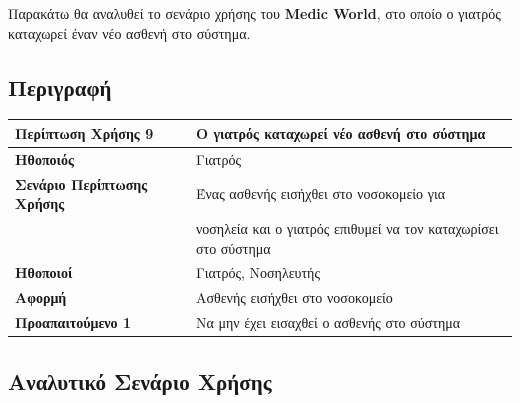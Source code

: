 \documentclass{article}
\newcommand\T{\rule{0pt}{2.6ex}}       %
\newcommand\B{\rule[-1.2ex]{0pt}{0pt}}
\begin{document}
Παρακάτω θα αναλυθεί το σενάριο χρήσης του \textbf{Medic World}, στο οποίο ο γιατρός καταχωρεί έναν νέο ασθενή στο σύστημα.

\subsection{Περιγραφή}

\begin{center}
     \begin{tabular}{|l|l|}
     \hline
      \textbf{Περίπτωση Χρήσης 9} & Ο γιατρός καταχωρεί νέο ασθενή στο σύστημα \T\B \\ 
      \hline
      \textbf{Ηθοποιός} & Γιατρός \T\B \\
      \hline
      \textbf{Σενάριο Περίπτωσης Χρήσης} & Ένας ασθενής εισήχθει στο νοσοκομείο για   \T \\& νοσηλεία και ο γιατρός επιθυμεί να τον καταχωρίσει στο σύστημα \\
      \hline
      \textbf{Ηθοποιοί} & Γιατρός, Νοσηλευτής \T\B \\
      \hline
      \textbf{Αφορμή} &  Ασθενής εισήχθει στο νοσοκομείο\T\B \\
      \hline
      \textbf{Προαπαιτούμενο 1} & Να μην έχει εισαχθεί ο ασθενής στο σύστημα \T\B \\
      \hline
     \end{tabular}
 \end{center}
 
\newpage
 
 \subsection{Αναλυτικό Σενάριο Χρήσης}
 
\end{document}
